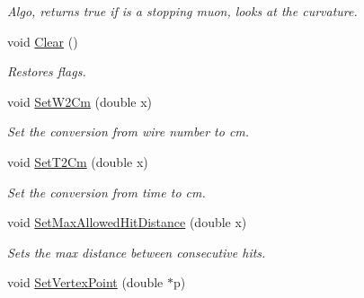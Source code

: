 \begin{DoxyCompactItemize}
\begin{DoxyCompactList}\small\item\em Algo, returns true if is a stopping muon, looks at the curvature. \end{DoxyCompactList}\item 
\hypertarget{classubana_1_1StoppingMuonTaggerHelper_ab554ede892bc39f2b14d467bec986848}{void \hyperlink{classubana_1_1StoppingMuonTaggerHelper_ab554ede892bc39f2b14d467bec986848}{Clear} ()}\label{classubana_1_1StoppingMuonTaggerHelper_ab554ede892bc39f2b14d467bec986848}

\begin{DoxyCompactList}\small\item\em Restores flags. \end{DoxyCompactList}\item 
\hypertarget{classubana_1_1StoppingMuonTaggerHelper_a67ef3dbfca976e692e0ea4b8d45907b4}{void \hyperlink{classubana_1_1StoppingMuonTaggerHelper_a67ef3dbfca976e692e0ea4b8d45907b4}{Set\-W2\-Cm} (double x)}\label{classubana_1_1StoppingMuonTaggerHelper_a67ef3dbfca976e692e0ea4b8d45907b4}

\begin{DoxyCompactList}\small\item\em Set the conversion from wire number to cm. \end{DoxyCompactList}\item 
\hypertarget{classubana_1_1StoppingMuonTaggerHelper_a853100ee436c5acff437c36ad09fbe4f}{void \hyperlink{classubana_1_1StoppingMuonTaggerHelper_a853100ee436c5acff437c36ad09fbe4f}{Set\-T2\-Cm} (double x)}\label{classubana_1_1StoppingMuonTaggerHelper_a853100ee436c5acff437c36ad09fbe4f}

\begin{DoxyCompactList}\small\item\em Set the conversion from time to cm. \end{DoxyCompactList}\item 
\hypertarget{classubana_1_1StoppingMuonTaggerHelper_af798c191a601dd47a3f7750fa0380cd8}{void \hyperlink{classubana_1_1StoppingMuonTaggerHelper_af798c191a601dd47a3f7750fa0380cd8}{Set\-Max\-Allowed\-Hit\-Distance} (double x)}\label{classubana_1_1StoppingMuonTaggerHelper_af798c191a601dd47a3f7750fa0380cd8}

\begin{DoxyCompactList}\small\item\em Sets the max distance between consecutive hits. \end{DoxyCompactList}\item 
\hypertarget{classubana_1_1StoppingMuonTaggerHelper_a5976d8184170072208dcf78f9c2d6866}{void \hyperlink{classubana_1_1StoppingMuonTaggerHelper_a5976d8184170072208dcf78f9c2d6866}{Set\-Vertex\-Point} (double $\ast$p)}\label{classubana_1_1StoppingMuonTaggerHelper_a5976d8184170072208dcf78f9c2d6866}


\end{DoxyCompactItemize}

